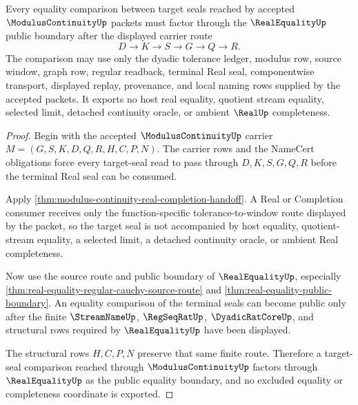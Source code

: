 \begin{theorem}
\label{thm:modulus-continuity-real-equality-handoff}
Every equality comparison between target seals reached by accepted $\ModulusContinuityUp$ packets must factor through the $\RealEqualityUp$ public boundary after the displayed carrier route
$$
D \to K \to S \to G \to Q \to R .
$$
The comparison may use only the dyadic tolerance ledger, modulus row, source window, graph row, regular readback, terminal Real seal, componentwise transport, displayed replay, provenance, and local naming rows supplied by the accepted packets. It exports no host real equality, quotient stream equality, selected limit, detached continuity oracle, or ambient $\RealUp$ completeness.
\end{theorem}
\begin{proof}
Begin with the accepted $\ModulusContinuityUp$ carrier $M=(G,S,K,D,Q,R,H,C,P,N)$. The carrier rows and the NameCert obligations force every target-seal read to pass through $D,K,S,G,Q,R$ before the terminal Real seal can be consumed.

Apply \autoref{thm:modulus-continuity-real-completion-handoff}. A Real or Completion consumer receives only the function-specific tolerance-to-window route displayed by the packet, so the target seal is not accompanied by host equality, quotient-stream equality, a selected limit, a detached continuity oracle, or ambient Real completeness.

Now use the source route and public boundary of $\RealEqualityUp$, especially \autoref{thm:real-equality-regular-cauchy-source-route} and \autoref{thm:real-equality-public-boundary}. An equality comparison of the terminal seals can become public only after the finite $\StreamNameUp$, $\RegSeqRatUp$, $\DyadicRatCoreUp$, and structural rows required by $\RealEqualityUp$ have been displayed.

The structural rows $H,C,P,N$ preserve that same finite route. Therefore a target-seal comparison reached through $\ModulusContinuityUp$ factors through $\RealEqualityUp$ as the public equality boundary, and no excluded equality or completeness coordinate is exported.
\end{proof}

